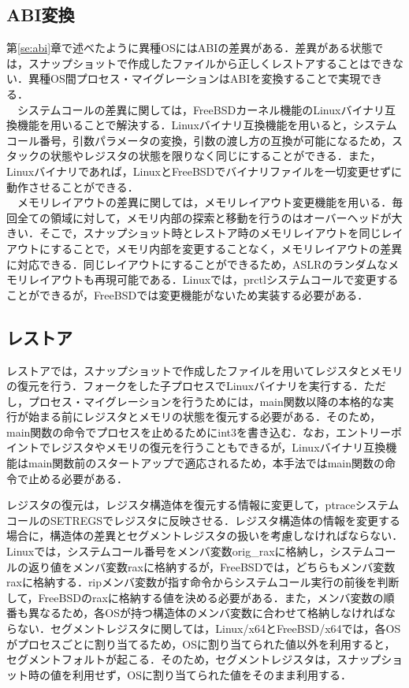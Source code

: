 \documentclass{ipsjpapers}
\begin{document}
\subsection{ABI変換}
\label{se:conv}
第\ref{se:abi}章で述べたように異種OSにはABIの差異がある．差異がある状態では，スナップショットで作成したファイルから正しくレストアすることはできない．異種OS間プロセス・マイグレーションはABIを変換することで実現できる．\\
　システムコールの差異に関しては，FreeBSDカーネル機能のLinuxバイナリ互換機能\cite{linux-emu}を用いることで解決する．Linuxバイナリ互換機能を用いると，システムコール番号，引数パラメータの変換，引数の渡し方の互換が可能になるため，スタックの状態やレジスタの状態を限りなく同じにすることができる．また，Linuxバイナリであれば，LinuxとFreeBSDでバイナリファイルを一切変更せずに動作させることができる．\\
　メモリレイアウトの差異に関しては，メモリレイアウト変更機能を用いる．毎回全ての領域に対して，メモリ内部の探索と移動を行うのはオーバーヘッドが大きい．そこで，スナップショット時とレストア時のメモリレイアウトを同じレイアウトにすることで，メモリ内部を変更することなく，メモリレイアウトの差異に対応できる．同じレイアウトにすることができるため，ASLRのランダムなメモリレイアウトも再現可能である．Linuxでは，prctlシステムコールで変更することができるが，FreeBSDでは変更機能がないため実装する必要がある．
\subsection{レストア}
レストアでは，スナップショットで作成したファイルを用いてレジスタとメモリの復元を行う．フォークをした子プロセスでLinuxバイナリを実行する．ただし，プロセス・マイグレーションを行うためには，main関数以降の本格的な実行が始まる前にレジスタとメモリの状態を復元する必要がある．そのため，main関数の命令でプロセスを止めるためにint3を書き込む．なお，エントリーポイントでレジスタやメモリの復元を行うこともできるが，Linuxバイナリ互換機能はmain関数前のスタートアップで適応されるため，本手法ではmain関数の命令で止める必要がある．

レジスタの復元は，レジスタ構造体を復元する情報に変更して，ptraceシステムコールのSETREGSでレジスタに反映させる．レジスタ構造体の情報を変更する場合に，構造体の差異とセグメントレジスタの扱いを考慮しなければならない．Linuxでは，システムコール番号をメンバ変数orig\_raxに格納し，システムコールの返り値をメンバ変数raxに格納するが，FreeBSDでは，どちらもメンバ変数raxに格納する．ripメンバ変数が指す命令からシステムコール実行の前後を判断して，FreeBSDのraxに格納する値を決める必要がある．また，メンバ変数の順番も異なるため，各OSが持つ構造体のメンバ変数に合わせて格納しなければならない．セグメントレジスタに関しては，Linux\slash{}x64とFreeBSD\slash{}x64では，各OSがプロセスごとに割り当てるため，OSに割り当てられた値以外を利用すると，セグメントフォルトが起こる．そのため，セグメントレジスタは，スナップショット時の値を利用せず，OSに割り当てられた値をそのまま利用する．
\end{document}
